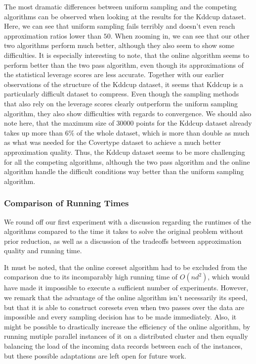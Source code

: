 The most dramatic differences between uniform sampling and the
competing algorithms can be observed when looking
at the results for the Kddcup dataset. Here, we can see that
uniform sampling fails terribly and doesn't even reach
approximation ratios lower than $50$. When zooming in, we can
see that our other two algorithms perform much better, although they
also seem to show some difficulties. It is especially interesting
to note, that the online algorithm seems to perform better than the
two pass algorithm, even though its approximations of the
statistical leverage scores are less accurate.
Together with our earlier observations of the structure of the
Kddcup dataset, it seems that Kddcup is a particularly difficult
dataset to compress. Even though the sampling methods that
also rely on the leverage scores clearly outperform the
uniform sampling algorithm, they also show difficulties with
regards to convergence. We should also note here, that the
maximum size of $30000$ points for the Kddcup dataset already
takes up more than $6\%$ of the whole dataset, which is more than
double as much as what was needed for the Covertype dataset to
achieve a much better approximation quality.
Thus, the Kddcup dataset seems to be more challenging for all the
competing algorithms, although the two pass algorithm and the
online algorithm handle the difficult conditions way better than
the uniform sampling algorithm.

\subsubsection{Comparison of Running Times}
\label{sec:running-times-comparison-ml}

We round off our first experiment with a discussion regarding the
runtimes of the algorithms compared to the time it takes to
solve the original problem without prior reduction, as well as
a discussion of the tradeoffs between approximation quality and
running time.

It must be noted, that the online coreset algorithm
had to be excluded from the comparison due to its
incomparably high running time of $O(nd^2)$, which would have
made it impossible to execute a sufficient number of experiments.
However, we remark that the advantage of the online algorithm isn't
necessarily its speed, but that it is able to construct coresets
even when two passes over the data are impossible and every sampling
decision has to be made immediately. Also, it might be possible
to drastically increase the efficiency of the online algorithm,
by running mutiple parallel instances of it on a distributed
cluster and then equally balancing the load of the incoming
data records between
each of the instances, but these possible adaptations are
left open for future work.

